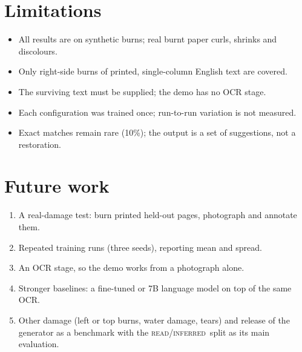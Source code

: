 \documentclass[12pt,a4paper,oneside]{report}
\newcommand{\READ}{\texorpdfstring{\textsc{read}}{READ}}
\newcommand{\INF}{\texorpdfstring{\textsc{inferred}}{INFERRED}}
\begin{document}
\section{Limitations}
\begin{itemize}[leftmargin=2em,itemsep=1pt]
\item All results are on synthetic burns; real burnt paper curls, shrinks and discolours.
\item Only right-side burns of printed, single-column English text are covered.
\item The surviving text must be supplied; the demo has no OCR stage.
\item Each configuration was trained once; run-to-run variation is not measured.
\item Exact matches remain rare (10\%); the output is a set of suggestions, not a restoration.
\end{itemize}

\section{Future work}
\begin{enumerate}[leftmargin=2em,itemsep=1pt]
\item A real-damage test: burn printed held-out pages, photograph and annotate them.
\item Repeated training runs (three seeds), reporting mean and spread.
\item An OCR stage, so the demo works from a photograph alone.
\item Stronger baselines: a fine-tuned or 7B language model on top of the same OCR.
\item Other damage (left or top burns, water damage, tears) and release of the generator as a
benchmark with the \READ/\INF\ split as its main evaluation.
\end{enumerate}
\end{document}
